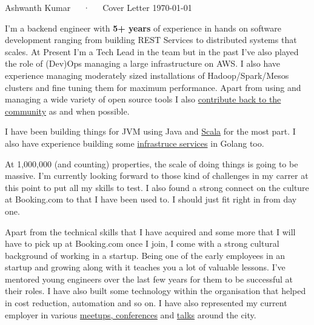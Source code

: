 \documentclass[11pt, a4paper]{awesome-cv}
\begin{document}
\makecvheader

\makecvfooter
  {}
  {Ashwanth Kumar~~~·~~~Cover Letter}
  {\today}

\makelettertitle

\begin{cvletter}

I'm a backend engineer with \textbf{5+ years} of experience in hands on software development ranging from building REST Services to distributed systems that scales. At Present I'm a Tech Lead in the team but in the past I've also played the role of (Dev)Ops managing a large infrastructure on AWS. I also have experience managing moderately sized installations of Hadoop/Spark/Mesos clusters and fine tuning them for maximum performance. Apart from using and managing a wide variety of open source tools I also \href{https://github.com/ashwanthkumar}{contribute back to the community} as and when possible.

I have been building things for JVM using Java and \href{https://git.io/vQgx5}{Scala} for the most part. I also have experience building some \href{https://github.com/ashwanthkumar/gotlb}{infrastruce services} in Golang too.

At 1,000,000 (and counting) properties, the scale of doing things is going to be massive. I'm currently looking forward to those kind of challenges in my carrer at this point to put all my skills to test. I also found a strong connect on the culture at Booking.com to that I have been used to. I should just fit right in from day one.

Apart from the technical skills that I have acquired and some more that I will have to pick up at Booking.com once I join, I come with a strong cultural background of working in a startup. Being one of the early employees in an startup and growing along with it teaches you a lot of valuable lessons. I've mentored young engineers over the last few years for them to be successful at their roles. I have also built some technology within the organisation that helped in cost reduction, automation and so on. I have also represented my current employer in various \href{https://speakerdeck.com/ashwanthkumar/}{meetups, conferences} and \href{https://www.youtube.com/playlist?list=PLyMKpkdEV2csQg93bEPv2R27sawxIm9zG}{talks} around the city.

\end{cvletter}


\makeletterclosing
\end{document}
